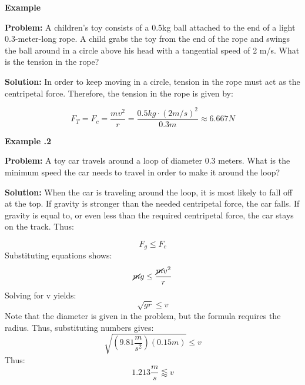 	
	\begin{mdframed}[backgroundcolor=blue!10!white]
		\begin{center}
			\textbf{Example \thesubsection}
		\end{center}
		\textbf{Problem:} A children's toy consists of a 0.5kg ball attached to the end of a light 0.3-meter-long rope.  A child grabs the toy from the end of the rope and swings the ball around in a circle above his head with a tangential speed of 2 m/s.  What is the tension in the rope? 
		
		\vspace{0.1in}
		
		\textbf{Solution:} In order to keep moving in a circle, tension in the rope must act as the centripetal force.  Therefore, the tension in the rope is given by:
	
		\begin{equation*}
			F_T = F_c = \frac{mv^2}{r} = \frac{0.5 kg \cdot (2 m/s )^2}{0.3m} \approx \boxed{6.667 N}
		\end{equation*}
		
		\end{mdframed}
	
	
		\begin{mdframed}[backgroundcolor=blue!10!white]
		\begin{center}
			\textbf{Example \thesubsection.2}
		\end{center}
		\textbf{Problem:} A toy car travels around a loop of diameter 0.3 meters.  What is the minimum speed the car needs to travel in order to make it around the loop?
		
		\vspace{0.1in}
		
		\textbf{Solution:} When the car is traveling around the loop, it is most likely to fall off at the top.  If gravity is stronger than the needed centripetal force, the car falls.  If gravity is equal to, or even less than the required centripetal force, the car stays on the track.  Thus:
		
		\begin{equation*}
		F_g \leq  	F_c 
		\end{equation*}
		Substituting equations shows: 
		\begin{equation*}
		\cancel{m}g \leq  	\frac{\cancel{m}v^2}{r} 
		\end{equation*}
		Solving for v yields: 
		\begin{equation*}
				\sqrt{g r} \leq v
		\end{equation*}
		Note that the diameter is given in the problem, but the formula requires the radius.  Thus, substituting numbers gives: 
				\begin{equation*}
		\sqrt{(9.81 \frac{m}{s^2})(0.15m) } \leq v
		\end{equation*}
		Thus:
				\begin{equation*}
		\boxed{1.213 \frac{m}{s}  \lessapprox v}
		\end{equation*}
		
		
		
	\end{mdframed}
	
